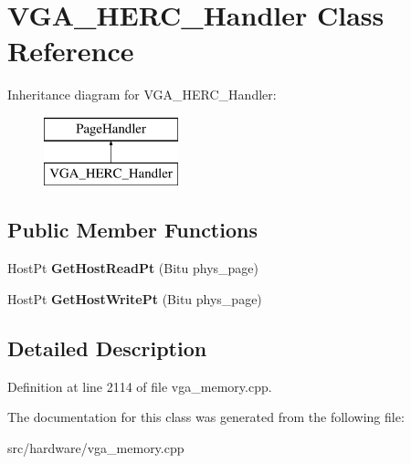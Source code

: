 \hypertarget{classVGA__HERC__Handler}{\section{V\-G\-A\-\_\-\-H\-E\-R\-C\-\_\-\-Handler Class Reference}
\label{classVGA__HERC__Handler}
}
Inheritance diagram for V\-G\-A\-\_\-\-H\-E\-R\-C\-\_\-\-Handler\-:\begin{figure}[H]
\begin{center}
\leavevmode
\includegraphics[height=2.000000cm]{classVGA__HERC__Handler}
\end{center}
\end{figure}
\subsection*{Public Member Functions}
\begin{DoxyCompactItemize}
\item 
\hypertarget{classVGA__HERC__Handler_ae520d92ecc21ac737cfc8039316e6e5c}{Host\-Pt {\bfseries Get\-Host\-Read\-Pt} (Bitu phys\-\_\-page)}\label{classVGA__HERC__Handler_ae520d92ecc21ac737cfc8039316e6e5c}

\item 
\hypertarget{classVGA__HERC__Handler_a25f8f05f6c70a3170445cf0ae346718e}{Host\-Pt {\bfseries Get\-Host\-Write\-Pt} (Bitu phys\-\_\-page)}\label{classVGA__HERC__Handler_a25f8f05f6c70a3170445cf0ae346718e}

\end{DoxyCompactItemize}


\subsection{Detailed Description}


Definition at line 2114 of file vga\-\_\-memory.\-cpp.



The documentation for this class was generated from the following file\-:\begin{DoxyCompactItemize}
\item 
src/hardware/vga\-\_\-memory.\-cpp\end{DoxyCompactItemize}
